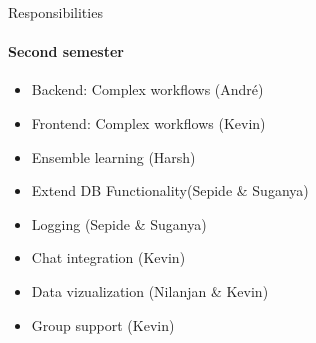 \begin{frame}{Responsibilities}
\framesubtitle{Second semester}
	\begin{itemize}
		\item Backend: Complex workflows (André)
		\item Frontend: Complex workflows (Kevin)
		\item Ensemble learning  (Harsh)
		\item Extend DB Functionality(Sepide \& Suganya)
		\item Logging (Sepide \& Suganya)
		\item Chat integration (Kevin)
		\item Data vizualization (Nilanjan \& Kevin)
		\item Group support (Kevin)
	\end{itemize}
\end{frame}